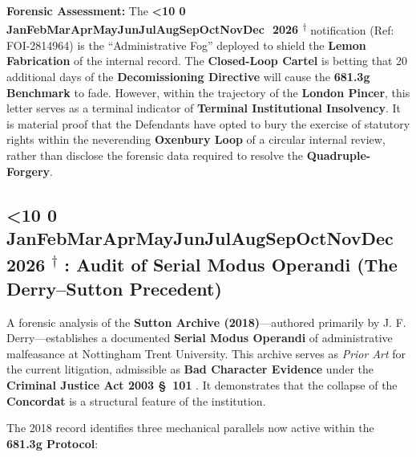 \documentclass{EMBASSY}
\DeclareRobustCommand{\gmt}[3]{%
    \texorpdfstring{%
        {\color{DateGold}\textbf{%
            \ifnum#1<10 0\fi#1\,\textperiodcentered\,%
            \ifcase#2\or Jan\or Feb\or Mar\or Apr\or May\or Jun\or Jul\or Aug\or Sep\or Oct\or Nov\or Dec\fi
            \,\textperiodcentered\,20#3%
            \textsuperscript{$\dagger$}%
        }}%
    }{%
        (#1/#2/#3)%
    }%
}
\begin{document}
\noindent\textbf{Forensic Assessment:} The \gmt{25}{3}{26} notification (Ref: FOI-2814964) is the ``Administrative Fog'' deployed to shield the \textbf{Lemon Fabrication} of the internal record. The \textbf{Closed-Loop Cartel} is betting that 20 additional days of the \textbf{Decomissioning Directive} will cause the \textbf{681.3g Benchmark} to fade. However, within the trajectory of the \textbf{London Pincer}, this letter serves as a terminal indicator of \textbf{Terminal Institutional Insolvency}. It is material proof that the Defendants have opted to bury the exercise of statutory rights within the neverending \textbf{Oxenbury Loop} of a circular internal review, rather than disclose the forensic data required to resolve the \textbf{Quadruple-Forgery}.

\subsection{\gmt{26}{3}{26}: Audit of Serial Modus Operandi (The Derry--Sutton Precedent)}
A forensic analysis of the \textbf{Sutton Archive (2018)}---authored primarily by J. F. Derry---establishes a documented \textbf{Serial Modus Operandi} of administrative malfeasance at Nottingham Trent University. This archive serves as \textit{Prior Art} for the current litigation, admissible as \textbf{Bad Character Evidence} under the \textbf{Criminal Justice Act 2003 \S~101} \cite{CJA03}. It demonstrates that the collapse of the \textbf{Concordat} \cite{Concordat25} is a structural feature of the institution.

The 2018 record identifies three mechanical parallels now active within the \textbf{681.3g Protocol}:
\end{document}

